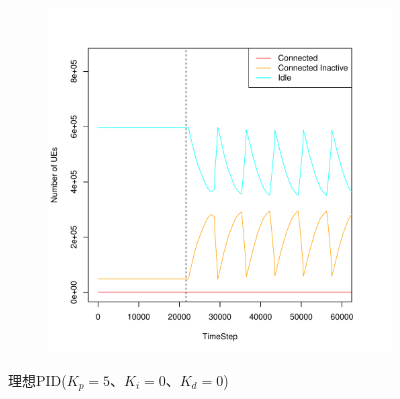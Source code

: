 \documentclass[a4j]{ujarticle}
\begin{document}
\begin{figure}[htbp]
\begin{subfigure}{0.49\hsize}
   \label{subfig:scenario_5_signaling_and_memoryload_vs_timeStep_86400_345600_5_0_0_0_ideal}
 \end{subfigure}
 \begin{subfigure}{0.49\hsize}
   \centering
   \includegraphics[width=1.0\hsize]{scenario_5_stateBreakdown_86400_345600_5_0_0_0_ideal.pdf}
   \label{subfig:scenario_5_stateBreakdown_86400_345600_5_0_0_0_ideal}
 \end{subfigure}
 \caption{理想PID($K_p = 5、K_i = 0、K_d = 0$)}
 \label{fig:result_pid_ideal_5_0_0_0}
\end{figure}
\end{document}

